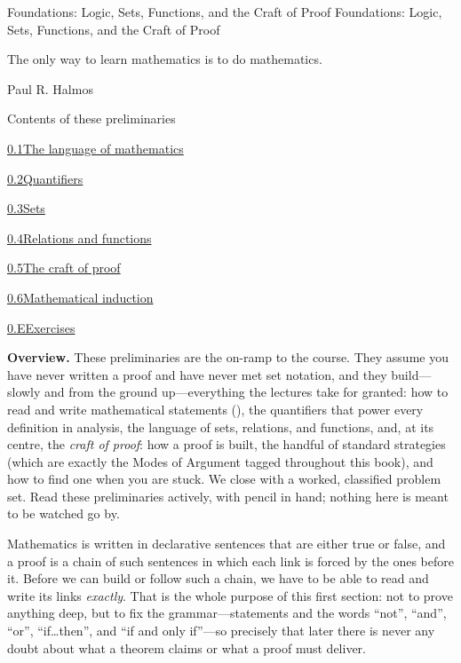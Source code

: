 \documentclass[main.tex]{subfiles}
\begin{document}
%
  {Foundations: Logic, Sets, Functions, and the Craft of Proof}%
  {Foundations: Logic, Sets, Functions, and the Craft of Proof}

\epigraph{The only way to learn mathematics is to do mathematics.}{Paul R. Halmos}

\begin{lecturecontents}{Contents of these preliminaries}
  \item \hyperlink{0.1}{0.1\quad The language of mathematics}
  \item \hyperlink{0.2}{0.2\quad Quantifiers}
  \item \hyperlink{0.3}{0.3\quad Sets}
  \item \hyperlink{0.4}{0.4\quad Relations and functions}
  \item \hyperlink{0.5}{0.5\quad The craft of proof}
  \item \hyperlink{0.6}{0.6\quad Mathematical induction}
  \item \hyperlink{0.E}{0.E\quad Exercises}
\end{lecturecontents}

\bigskip
\noindent\textbf{Overview.} These preliminaries are the on-ramp to the course. They assume you have never
written a proof and have never met set notation, and they build---slowly and from the ground
up---everything the lectures take for granted: how to read and write mathematical statements
(), the quantifiers that power every definition in analysis, the language of sets,
relations, and functions, and, at its centre, the \emph{craft of proof}: how a proof is built, the
handful of standard strategies (which are exactly the Modes of Argument tagged throughout this
book), and how to find one when you are stuck. We close with a worked, classified problem set. Read
these preliminaries actively, with pencil in hand; nothing here is meant to be watched go by.

\clearpage

\noindent Mathematics is written in declarative sentences that are either true or false, and a proof
is a chain of such sentences in which each link is forced by the ones before it. Before we can build
or follow such a chain, we have to be able to read and write its links \emph{exactly}. That is the
whole purpose of this first section: not to prove anything deep, but to fix the grammar---statements
and the words ``not'', ``and'', ``or'', ``if\dots then'', and ``if and only if''---so precisely that
later there is never any doubt about what a theorem claims or what a proof must deliver.
\end{document}
